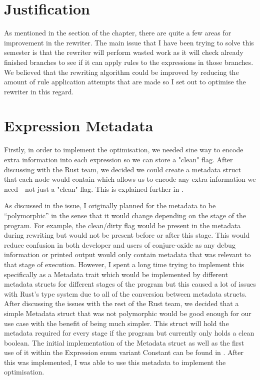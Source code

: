 \label{chapter:evaluation}

\section{Justification}

As mentioned in the  section of the
 chapter, there are quite a few areas for improvement
in the rewriter. The main issue that I have been trying to solve this semester
is that the rewriter will perform wasted work as it will check already finished
branches to see if it can apply rules to the expressions in those branches. We believed
that the rewriting algorithm could be improved by reducing the amount of rule application
attempts that are made so I set out to optimise the rewriter in this regard.

\section{Expression Metadata}

Firstly, in order to implement the optimisation, we needed sine way to encode
extra information into each expression so we can store a "clean" flag. After
discussing with the Rust team, we decided we could create a metadata struct
that each node would contain which allows us to encode any extra information
we need - not just a "clean" flag. This is explained further in
.

As discussed
in the issue, I originally planned for the metadata to be “polymorphic” in the
sense that it would change depending on the stage of the program. For example,
the clean/dirty flag would be present in the metadata during rewriting but
would not be present before or after this stage. This would reduce confusion in
both developer and users of conjure-oxide as any debug information or printed
output would only contain metadata that was relevant to that stage of
execution. However, I spent a long time trying to implement this specifically
as a Metadata trait which would be implemented by different metadata structs
for different stages of the program but this caused a lot of issues with Rust’s
type system due to all of the conversion between metadata structs. After
discussing the issues with the rest of the Rust team, we decided that a simple
Metadata struct that was not polymorphic would be good enough for our use case
with the benefit of being much simpler. This struct will hold the metadata
required for every stage if the program but currently only holds a clean
boolean. The initial implementation of the Metadata struct as well as the first
use of it within the Expression enum variant Constant can be found in
. After this
was implemented, I was able to use this metadata to implement the optimisation.

